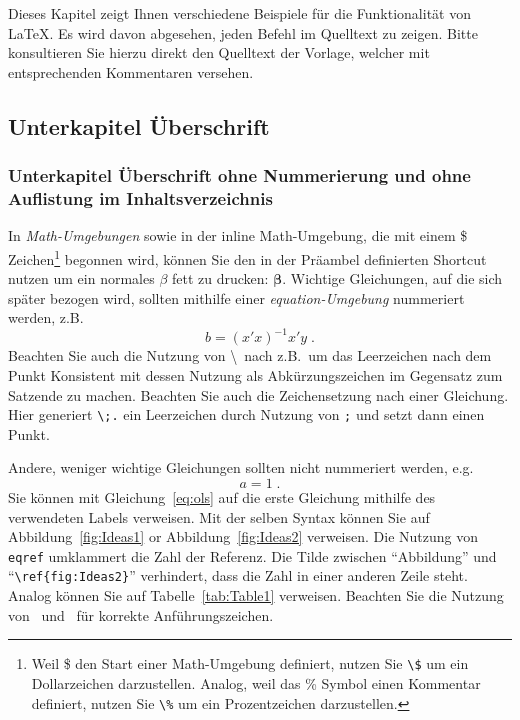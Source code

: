 \documentclass[a4paper,12pt]{scrartcl} %
\newcommand{\bs}{\boldsymbol}  %
\begin{document}
Dieses Kapitel zeigt Ihnen verschiedene Beispiele für die Funktionalität von \LaTeX. Es wird davon abgesehen, jeden Befehl im Quelltext zu zeigen. Bitte konsultieren Sie hierzu direkt den Quelltext der Vorlage, welcher mit entsprechenden Kommentaren versehen.

\subsection{Unterkapitel Überschrift} %

\subsubsection*{Unterkapitel Überschrift ohne Nummerierung und ohne Auflistung im Inhaltsverzeichnis} %

In \emph{Math-Umgebungen} sowie in der inline Math-Umgebung, die mit einem \$ Zeichen\footnote{Weil \$ den Start einer Math-Umgebung definiert, nutzen Sie \texttt{\textbackslash\$} um ein Dollarzeichen darzustellen. Analog, weil das \% Symbol einen Kommentar definiert, nutzen Sie \texttt{\textbackslash\%} um ein Prozentzeichen darzustellen.} begonnen wird, können Sie den in der Präambel definierten Shortcut nutzen um ein normales $\beta$ fett zu drucken: $\bs \beta$. Wichtige Gleichungen, auf die sich später bezogen wird, sollten mithilfe einer \emph{equation-Umgebung} nummeriert werden, z.B.\
\begin{equation}\label{eq:ols}
	b = (x'x)^{-1}x'y \;.
\end{equation}
Beachten Sie auch die Nutzung von \textbackslash\ nach z.B.\ um das Leerzeichen nach dem Punkt Konsistent mit dessen Nutzung als Abkürzungszeichen im Gegensatz zum Satzende zu machen. Beachten Sie auch die Zeichensetzung nach einer Gleichung. Hier generiert \verb|\;.| ein Leerzeichen durch Nutzung von \verb|;| und setzt dann einen Punkt.

Andere, weniger wichtige Gleichungen sollten nicht nummeriert werden, e.g.\
\begin{equation*}
	a = 1\;.
\end{equation*}
Sie können mit Gleichung~\eqref{eq:ols} auf die erste Gleichung mithilfe des verwendeten Labels verweisen. Mit der selben Syntax können Sie auf Abbildung~\ref{fig:Ideas1} or Abbildung~\ref{fig:Ideas2} verweisen. Die Nutzung von \texttt{eqref} umklammert die Zahl der Referenz. Die Tilde zwischen ``Abbildung'' und ``\verb|\ref{fig:Ideas2}|'' verhindert, dass die Zahl in einer anderen Zeile steht. Analog können Sie auf Tabelle~\ref{tab:Table1} verweisen. Beachten Sie die Nutzung von \textasciigrave\textasciigrave\ und \textquotesingle\textquotesingle\ für korrekte Anführungszeichen.
\end{document}
